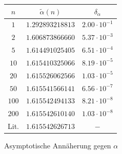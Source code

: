 \documentclass[10pt,a4paper]{article}
\begin{document}
\vspace{-10pt}
\begin{figure}[h]
\begin{minipage}[c]{0.5\textwidth}
\captionsetup{type=figure}
\begin{center}

\vspace{-22pt}
\caption{Asymptotische Annäherung gegen $\alpha$}
\label{plotkonvergenz2d}
\end{center}
\end{minipage}
\begin{minipage}[c]{0.5\textwidth}
\captionsetup{type=table}
\begin{center}
\begin{tabular}{c|c|c}
\rule[-1ex]{0pt}{2.5ex} $n$ & $\tilde{\alpha}(n)$ & $\delta_\alpha$ \\ 
\hline 
\rule[-1ex]{0pt}{2.5ex} $1$ & $1.292893218813$ & $2.00\cdot10^{-1}$ \\ 
\hline 
\rule[-1ex]{0pt}{2.5ex} $2$ & $1.606873866660$ & $5.37\cdot10^{-3}$ \\ 
\hline
\rule[-1ex]{0pt}{2.5ex} $5$ & $1.614491025405$ & $6.51\cdot10^{-4}$ \\ 
\hline 
\rule[-1ex]{0pt}{2.5ex} $10$ & $1.615410325066$ & $8.19\cdot10^{-5}$ \\ 
\hline 
\rule[-1ex]{0pt}{2.5ex} $20$ & $1.615526062566$ & $1.03\cdot10^{-5}$ \\ 
\hline 
\rule[-1ex]{0pt}{2.5ex} $50$ & $1.615541566141$ & $6.56\cdot10^{-7}$ \\
\hline
\rule[-1ex]{0pt}{2.5ex} $100$ & $1.615542494133$ & $8.21\cdot10^{-8}$ \\ 
\hline
\rule[-1ex]{0pt}{2.5ex} $200$ & $1.615542610140$ & $1.03\cdot10^{-8}$ \\ 
\hline
\rule[1ex]{0pt}{2.5ex} Lit.   & $1.615542626713$ & $ - $
\end{tabular}
\label{tab:konvergenz2d}
\end{center}
\end{minipage}
\end{figure}
\end{document}
